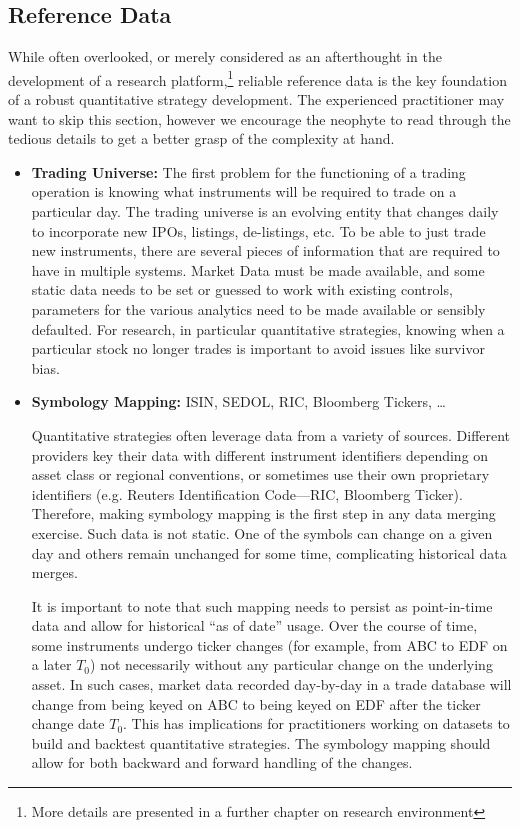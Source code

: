 \subsection{Reference Data} 

While often overlooked, or merely considered as an afterthought in the development of a research platform,\footnote{More details are presented in a further chapter on research environment} reliable reference data is the key foundation of a robust quantitative strategy development. The experienced practitioner may want to skip this section, however we encourage the neophyte to read through the tedious details to get a better grasp of the complexity at hand.


\begin{itemize}
\item \textbf{Trading Universe:} The first problem for the functioning of a trading operation is knowing what instruments will be required to trade on a particular day. The trading universe is an evolving entity that changes daily to incorporate new IPOs, listings, de-listings, etc. To be able to just trade new instruments, there are several pieces of information that are required to have in multiple systems. Market Data must be made available, and some static data needs to be set or guessed to work with existing controls, parameters for the various analytics need to be made available or sensibly defaulted. For research, in particular quantitative strategies, knowing when a particular stock no longer trades is important to avoid issues like survivor bias.
 
 
\item \textbf{Symbology Mapping:} ISIN, SEDOL, RIC, Bloomberg Tickers, \dots \par\vspace{\baselineskip}

Quantitative strategies often leverage data from a variety of sources. Different providers key their data with different instrument identifiers depending on asset class or regional conventions, or sometimes use their own proprietary identifiers (e.g. Reuters Identification Code---RIC, Bloomberg Ticker). Therefore, making symbology mapping is the first step in any data merging exercise. Such data is not static. One of the symbols can change on a given day and others remain unchanged for some time, complicating historical data merges.


It is important to note that such mapping needs to persist as point-in-time data and allow for historical ``as of date'' usage. Over the course of time, some instruments undergo ticker changes (for example, from ABC to EDF on a later $T_0$) not necessarily without any particular change on the underlying asset. In such cases, market data recorded day-by-day in a trade database will change from being keyed on ABC to being keyed on EDF after the ticker change date $T_0$. This has implications for practitioners working on datasets to build and backtest quantitative strategies. The symbology mapping should allow for both backward and forward handling of the changes.



\end{itemize}
